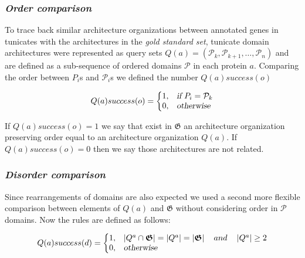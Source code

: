 \documentclass[11pt]{article}
\begin{document}
\subsubsection*{\textit{\textbf{O}rder comparison}}

To trace back similar architecture organizations between annotated genes in 
tunicates with the architectures in the \textsl{gold standard set}, tunicate 
domain architectures were represented as query sets  $Q(a) = 
(\mathcal{P}_k,\mathcal{P}_{k+1},\ldots,\mathcal{P}_n)$ and are defined as a 
sub-sequence of ordered domains $\mathcal{P}$ in each protein $a$. Comparing 
the order between $P_i$s and $\mathcal{P}_i$s we defined the number 
$Q(a){success}(o)$

\begin{equation}
  Q(a){success(o)}=\left\{
  \begin{array}{@{}ll@{}}
    1, & \textsl{if}\ P_{i} = \mathcal{P}_{k} \\
    0, & \textsl{otherwise}
  \end{array}\right.
\end{equation} 

If $Q(a){success(o)} = 1$ we say that exist in $\boldsymbol{\mathfrak{G}}$ 
an architecture organization preserving order equal to an architecture 
organization $Q(a)$. If $Q(a){success(o)} = 0$ then we say those 
architectures are not related.

\subsubsection*{\textit{\textbf{D}isorder comparison}}
Since rearrangements of domains are also expected we used a second more 
flexible comparison between elements of $Q(a)$ and 
$\boldsymbol{\mathfrak{G}}$ without considering order in $\mathcal{P}$ domains. 
Now the rules are defined as follows:

\begin{equation}
  Q(a){success(d)}=\left\{
  \begin{array}{@{}ll@{}}
    1, & \left|Q^a \cap \boldsymbol{\mathfrak{G}}\right| = 
\left|Q^a\right| = \left|\boldsymbol{\mathfrak{G}}\right| \quad and \quad 
\left|Q^a\right| \geq 2 \\
    0, & \textsl{otherwise}
  \end{array}\right.
\end{equation}
\end{document}
